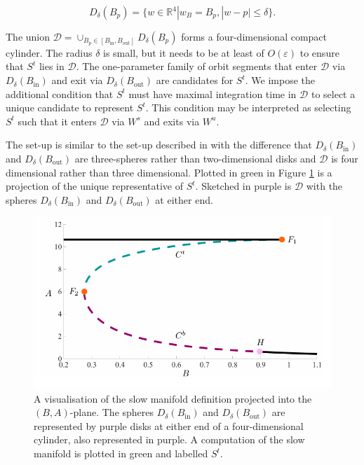 \documentclass{ws-ijbc}
\begin{document}
\begin{equation*}
D_\delta(B_p)=\{w \in \mathbb{R}^4 | w_B = B_p, |w-p| \leq \delta\}.
\end{equation*}
    
\noindent
The union $\mathscr{D} = \cup_{B_p \in [B_{\mathrm{in}}, B_{\mathrm{out}}]} D_\delta(B_p)$ forms a four-dimensional compact cylinder.  The radius $\delta$ is small, but it needs to be at least of $O(\varepsilon)$ to ensure that $S^t$ lies in $\mathscr{D}$.  The one-parameter family of orbit segments that enter $\mathscr{D}$ via $D_\delta(B_{\mathrm{in}})$ and exit via $D_\delta(B_{\mathrm{out}})$ are candidates for $S^t$.   We impose the additional condition that $S^t$ must have maximal integration time in $\mathscr{D}$ to select a unique candidate to represent $S^t$.  This condition may be interpreted as selecting $S^t$ such that it enters $\mathscr{D}$ via $W^s$ and exits via $W^u$.
    
The set-up is similar to the set-up described in \cite{Saeed_Paper} with the difference that $D_\delta(B_{\mathrm{in}})$ and $D_\delta(B_{\mathrm{out}})$ are three-spheres rather than two-dimensional disks and $\mathscr{D}$ is four dimensional rather than three dimensional.  Plotted in green in Figure \ref{tube_figure} is a projection of the unique representative of $S^t$.  Sketched in purple is $\mathscr{D}$ with the spheres $D_\delta(B_{\mathrm{in}})$ and $D_\delta(B_{\mathrm{out}})$ at either end.

\begin{figure}[!t]
\begin{center}
\includegraphics[page=2, width=\textwidth]{figures.pdf}
\end{center}
\caption{A visualisation of the slow manifold definition projected into the $(B,A)$-plane.  The spheres $D_\delta(B_{\mathrm{in}})$ and $D_\delta(B_{\mathrm{out}})$ are represented by purple disks at either end of a four-dimensional cylinder, also represented in purple.  A computation of the slow manifold is plotted in green and labelled $S^t$.}
\label{tube_figure}
\end{figure}
\end{document}
